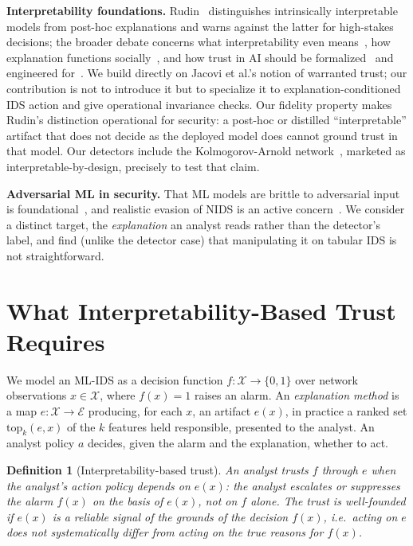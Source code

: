 \documentclass[conference]{IEEEtran}
\newtheorem{definition}{Definition}
\begin{document}
\textbf{Interpretability foundations.} Rudin~\cite{rudin2019} distinguishes intrinsically
interpretable models from post-hoc explanations and warns against the latter for high-stakes
decisions; the broader debate concerns what interpretability even means~\cite{lipton2018mythos,doshivelez2017rigorous},
how explanation functions socially~\cite{miller2019explanation}, and how trust in AI should be
formalized~\cite{jacovi2021formalizing} and engineered for~\cite{kastner2021}. We build directly on
Jacovi et al.'s notion of warranted trust; our contribution is not to introduce it but to
specialize it to explanation-conditioned IDS action and give operational invariance checks. Our
fidelity property makes Rudin's distinction
operational for security: a post-hoc or distilled ``interpretable'' artifact that does not decide
as the deployed model does cannot ground trust in that model. Our detectors include the
Kolmogorov-Arnold network~\cite{liu2024kan}, marketed as interpretable-by-design, precisely to
test that claim.

\textbf{Adversarial ML in security.} That ML models are brittle to adversarial input is
foundational~\cite{szegedy2014intriguing,biggio2018wild,carlini2017towards}, and realistic
evasion of NIDS is an active concern~\cite{apruzzese2022modeling}. We consider a distinct target,
the \emph{explanation} an analyst reads rather than the detector's label, and find (unlike the
detector case) that manipulating it on tabular IDS is not straightforward.

\section{What Interpretability-Based Trust Requires}\label{sec:formal}
We model an ML-IDS as a decision function $f:\mathcal{X}\to\{0,1\}$ over network observations
$x\in\mathcal{X}$, where $f(x)=1$ raises an alarm. An \emph{explanation method} is a map
$e:\mathcal{X}\to\mathcal{E}$ producing, for each $x$, an artifact $e(x)$, in practice a ranked
set $\mathrm{top}_k(e,x)$ of the $k$ features held responsible, presented to the analyst. An
analyst policy $a$ decides, given the alarm and the explanation, whether to act.

\begin{definition}[Interpretability-based trust]
An analyst \emph{trusts $f$ through $e$} when the analyst's action policy depends on $e(x)$: the
analyst escalates or suppresses the alarm $f(x)$ on the basis of $e(x)$, not on $f$ alone. The
trust is \emph{well-founded} if $e(x)$ is a reliable signal of the grounds of the decision
$f(x)$, i.e.\ acting on $e$ does not systematically differ from acting on the true reasons for
$f(x)$.
\end{definition}
\end{document}
